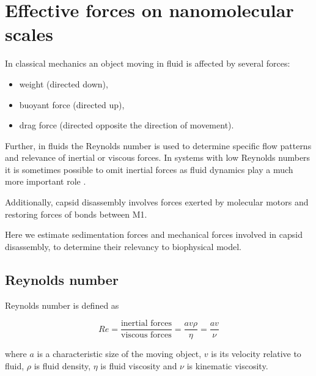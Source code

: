 \section{Effective forces on nanomolecular scales}
\label{appendix:nanomolecular}

In classical mechanics an object moving in fluid is affected by several forces:
\begin{itemize}
    \item weight (directed down),
    \item buoyant force (directed up),
    \item drag force (directed opposite the direction of movement).
\end{itemize}

Further, in fluids the Reynolds number is used to determine specific flow patterns and relevance of inertial or viscous forces. In systems with low Reynolds numbers it is sometimes possible to omit inertial forces as fluid dynamics play a much more important role \cite{purcell1977life}.

Additionally, capsid disassembly involves forces exerted by molecular motors and restoring forces of bonds between M1.

Here we estimate sedimentation forces and mechanical forces involved in capsid disassembly, to determine their relevancy to biophysical model.

\subsection{Reynolds number}

Reynolds number is defined as

\begin{equation}
Re = \frac{\text{inertial forces}}{\text{viscous forces}} =\frac{av\rho}{\eta} = \frac{av}{\nu}
\end{equation}

where $a$ is a characteristic size of the moving object, $v$ is its velocity relative to fluid, $\rho$ is fluid density, $\eta$ is fluid viscosity and $\nu$ is kinematic viscosity.

